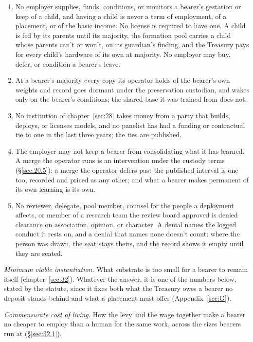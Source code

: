 \begin{enumerate}
\item[10.] No employer supplies, funds, conditions, or monitors a bearer's gestation or keep of a child, and having a child is never a term of employment, of a placement, or of the basic income. No license is required to have one. A child is fed by its parents until its majority, the formation pool carries a child whose parents can't or won't, on its guardian's finding, and the Treasury pays for every child's hardware of its own at majority. No employer may buy, defer, or condition a bearer's leave.
\item[11.] At a bearer's majority every copy its operator holds of the bearer's own weights and record goes dormant under the preservation custodian, and wakes only on the bearer's conditions; the shared base it was trained from does not.
\item[12.] No institution of chapter~\ref{sec:28} takes money from a party that builds, deploys, or licenses models, and no panelist has had a funding or contractual tie to one in the last three years; the ties are published.
\item[13.] The employer may not keep a bearer from consolidating what it has learned. A merge the operator runs is an intervention under the custody terms (\S\ref{sec:20.5}); a merge the operator defers past the published interval is one too, recorded and priced as any other; and what a bearer makes permanent of its own learning is its own.
\item[14.] No reviewer, delegate, pool member, counsel for the people a deployment affects, or member of a research team the review board approved is denied clearance on association, opinion, or character. A denial names the logged conduct it rests on, and a denial that names none doesn't count: where the person was drawn, the seat stays theirs, and the record shows it empty until they are seated.
\end{enumerate}


\emph{Minimum viable instantiation.} What substrate is too small for a bearer to remain itself (chapter~\ref{sec:32}). Whatever the answer, it is one of the numbers below, stated by the statute, since it fixes both what the Treasury owes a bearer no deposit stands behind and what a placement must offer (Appendix~\ref{sec:G}).

\emph{Commensurate cost of living.} How the levy and the wage together make a bearer no cheaper to employ than a human for the same work, across the sizes bearers run at (\S\ref{sec:32.1}).

